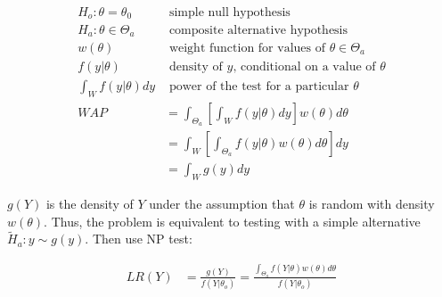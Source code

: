 \begin{align*}
    H_o: \theta=\theta_0 &\text{ simple null hypothesis}\\
    H_a: \theta\in \Theta_a &\text{ composite alternative hypothesis}\\
    w(\theta) &\text{ weight function for values of } \theta\in\Theta_a \\
    f(y | \theta) &\text{ density of $y$, conditional on a value of } \theta \\
    \int_W f(y | \theta) d y &\text{ power of the test for a particular } \theta\\
    WAP &=\int_{\Theta_{a}}\left[\int_W f(y | \theta) d y\right] w(\theta) d \theta \\
    &=\int_W\left[\int_{\Theta_a} f(y | \theta) w(\theta) d \theta\right] d y\\
    &=\int_W g(y) d y
\end{align*}

$g(Y)$ is the density of $Y$ under the assumption that $\theta$ is random with density $w(\theta)$. Thus, the problem is equivalent to testing with a simple alternative $\tilde{H}_a: y\sim g(y)$. Then use NP test:

\begin{align*}
    L R(Y)&=\frac{g(Y)}{f\left(Y | \theta_o\right)}=\frac{\int_{\Theta_a} f(Y | \theta) w(\theta) d \theta}{f\left(Y | \theta_o\right)}
\end{align*}